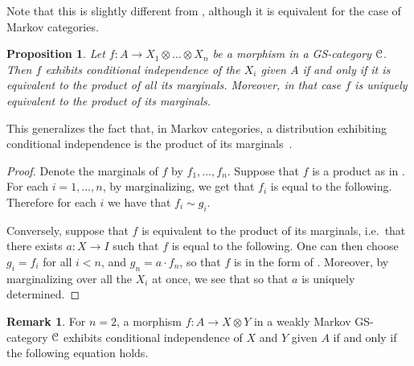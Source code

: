 \documentclass[a4paper,UKenglish,numberwithinsect,cleveref, autoref, thm-restate]{lipics-v2021}
\theoremstyle{plain} %
\newtheorem{myproposition}[mytheorem]{Proposition}
\theoremstyle{definition} %
\newtheorem{myremark}[mytheorem]{Remark}
\begin{document}
Note that this is slightly different from \cite[Definition~6.6]{cho_jacobs_2019}, although it is equivalent for the case of Markov categories.

\begin{myproposition}\label{eqcondind}
 Let $f:A\to X_1\otimes\dots\otimes X_n$ be a morphism in a GS-category $\mathcal{C}$. Then $f$ exhibits conditional independence of the $X_i$ given $A$ if and only if it is equivalent to the product of all its marginals.
 Moreover, in that case $f$ is \emph{uniquely} equivalent to the product of its marginals.
\end{myproposition}

This generalizes the fact that, in Markov categories, a distribution exhibiting conditional independence is the product of its marginals~\cite[Section~12]{Fritz_2020}.

\begin{proof}
 Denote the marginals of $f$ by $f_1,\dots,f_n$.
 Suppose that $f$ is a product as in . For each $i=1,\dots,n$, by marginalizing, we get that $f_i$ is equal to the following.
 Therefore for each $i$ we have that $f_i\sim g_i$. 
 
 Conversely, suppose that $f$ is equivalent to the product of its marginals, i.e.~that there exists $a:X\to I$ such that $f$ is equal to the following.
 One can then choose $g_i=f_i$ for all $i<n$, and $g_n = a\cdot f_n$, so that $f$ is in the form of .
 Moreover, by marginalizing over all the $X_i$ at once, we see that 
 so that $a$ is uniquely determined.
\end{proof} 
 
\begin{myremark}
 For $n=2$, a morphism $f:A\to X\otimes Y$ in a weakly Markov GS-category $\mathcal{C}$ exhibits conditional independence of $X$ and $Y$ given $A$ 
 if and only if the following equation holds.
\end{myremark}
\end{document}
